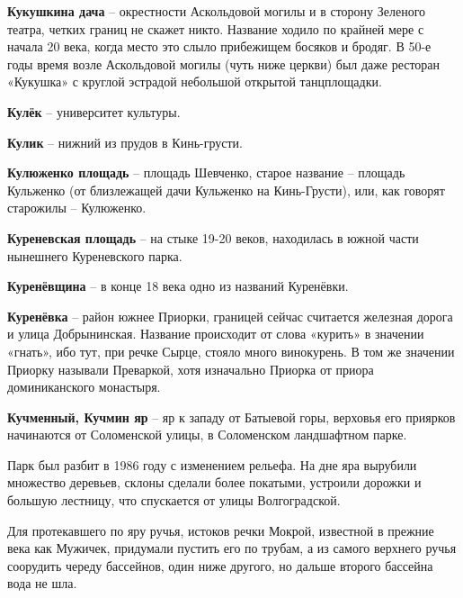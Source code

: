 \medskip

\textbf{Кукушкина дача} – окрестности Аскольдовой могилы и в сторону Зеленого театра, четких границ не скажет никто. Название ходило по крайней мере с начала 20 века, когда место это слыло прибежищем босяков и бродяг. В 50-е годы время возле Аскольдовой могилы (чуть ниже церкви) был даже ресторан «Кукушка» с круглой эстрадой небольшой открытой танцплощадки. \\

\medskip

\textbf{Кулёк} – университет культуры.\\


\medskip

\textbf{Кулик} – нижний из прудов в Кинь-грусти.\\

\medskip

\textbf{Кулюженко площадь} – площадь Шевченко, старое название – площадь Кульженко (от близлежащей дачи Кульженко на Кинь-Грусти), или, как говорят старожилы – Кулюженко.\\

\medskip

\textbf{Куреневская площадь} – на стыке 19-20 веков, находилась в южной части нынешнего Куреневского парка.\\

\medskip

\textbf{Куренёвщина} – в конце 18 века одно из названий Куренёвки.\\

\medskip

\textbf{Куренёвка} – район южнее Приорки, границей сейчас считается железная дорога и улица Добрынинская. Название происходит от слова «курить» в значении «гнать», ибо тут, при речке Сырце, стояло много винокурень. В том же значении Приорку называли Преваркой, хотя изначально Приорка от приора доминиканского монастыря.\\

\medskip

\textbf{Кучменный, Кучмин яр} – яр к западу от Батыевой горы, верховья его приярков начинаются от Соломенской улицы, в Соломенском ландшафтном парке.

Парк был разбит в 1986 году с изменением рельефа. На дне яра вырубили множество деревьев, склоны сделали более покатыми, устроили дорожки и большую лестницу, что спускается от улицы Волгоградской. 

Для протекавшего по яру ручья, истоков речки Мокрой, известной в прежние века как Мужичек, придумали пустить его по трубам, а из самого верхнего ручья соорудить череду бассейнов, один ниже другого, но дальше второго бассейна вода не шла.

